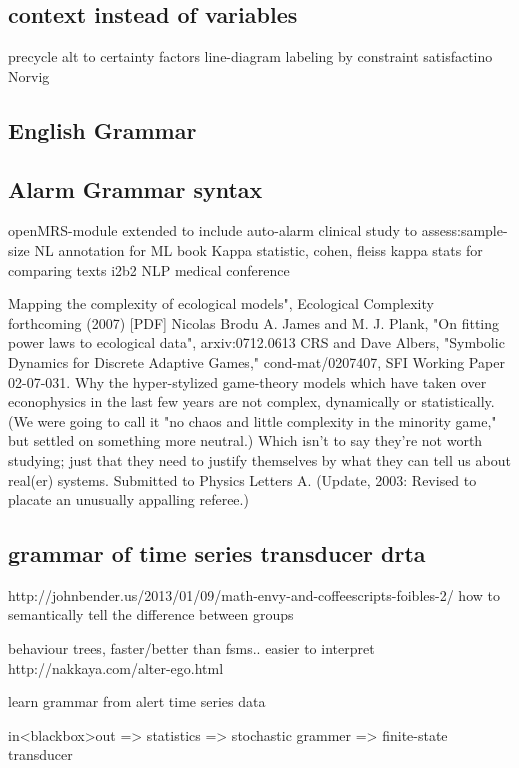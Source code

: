 \documentclass[12pt]{article}
\begin{document}
\subsection*{context instead of variables}
precycle
alt to certainty factors
line-diagram labeling by constraint satisfactino
Norvig
\subsection*{English Grammar}
\subsection*{Alarm Grammar syntax}
openMRS-module extended to include auto-alarm
clinical study to assess:sample-size
NL annotation for ML book
Kappa statistic, cohen, fleiss kappa stats for comparing texts
i2b2 NLP medical conference


    Mapping the complexity of ecological models", Ecological Complexity forthcoming (2007) [PDF]
Nicolas Brodu
A. James and M. J. Plank, "On fitting power laws to ecological data", arxiv:0712.0613
CRS and Dave Albers, "Symbolic Dynamics for Discrete Adaptive Games," cond-mat/0207407, SFI Working Paper 02-07-031. Why the hyper-stylized game-theory models which have taken over econophysics in the last few years are not complex, dynamically or statistically. (We were going to call it "no chaos and little complexity in the minority game," but settled on something more neutral.) Which isn't to say they're not worth studying; just that they need to justify themselves by what they can tell us about real(er) systems. Submitted to Physics Letters A. (Update, 2003: Revised to placate an unusually appalling referee.)

\subsection*{grammar of time series transducer drta  }
http://johnbender.us/2013/01/09/math-envy-and-coffeescripts-foibles-2/
how to semantically tell the difference between groups

behaviour trees, faster/better than fsms.. easier to interpret
http://nakkaya.com/alter-ego.html

learn grammar from alert time series data

in<blackbox>out => statistics => stochastic grammer => finite-state transducer
\end{document}
